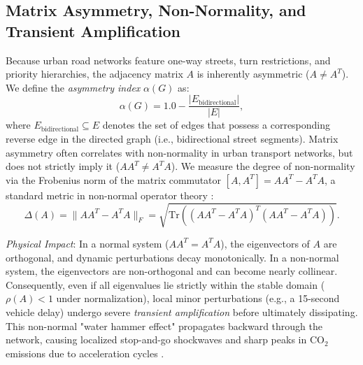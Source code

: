 \documentclass[lettersize,journal]{IEEEtran}
\begin{document}
\subsection{Matrix Asymmetry, Non-Normality, and Transient Amplification}
Because urban road networks feature one-way streets, turn restrictions, and priority hierarchies, the adjacency matrix $A$ is inherently asymmetric ($A \neq A^T$). We define the \emph{asymmetry index} $\alpha(G)$ as:
\begin{equation}
\alpha(G) = 1.0 - \frac{|E_{\text{bidirectional}}|}{|E|},
\end{equation}
where $E_{\text{bidirectional}} \subseteq E$ denotes the set of edges that possess a corresponding reverse edge in the directed graph (i.e., bidirectional street segments). Matrix asymmetry often correlates with non-normality in urban transport networks, but does not strictly imply it ($A A^T \neq A^T A$). We measure the degree of non-normality via the Frobenius norm of the matrix commutator $[A, A^T] = A A^T - A^T A$, a standard metric in non-normal operator theory \cite{Schur1909, Henrici1962}:
\begin{equation}
\Delta(A) = \| A A^T - A^T A \|_F = \sqrt{\text{Tr}\left( (A A^T - A^T A)^T (A A^T - A^T A) \right)}.
\end{equation}

\textit{Physical Impact}: In a normal system ($A A^T = A^T A$), the eigenvectors of $A$ are orthogonal, and dynamic perturbations decay monotonically. In a non-normal system, the eigenvectors are non-orthogonal and can become nearly collinear. Consequently, even if all eigenvalues lie strictly within the stable domain ($\rho(A) < 1$ under normalization), local minor perturbations (e.g., a 15-second vehicle delay) undergo severe \emph{transient amplification} before ultimately dissipating. This non-normal "water hammer effect" propagates backward through the network, causing localized stop-and-go shockwaves and sharp peaks in $\text{CO}_2$ emissions due to acceleration cycles \cite{Trefethen2005, Whitham2011, Kerner2009}.
\end{document}

